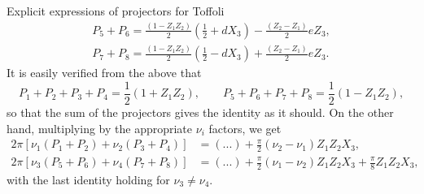 \begin{tbox}[label=tcolorbox:toffoli]{Explicit expressions of projectors for Toffoli \ccheck}
\begin{equation*}
	\end{equation*}
    \begin{align*}
        P_5 + P_6 = 
            \frac{(1 - Z_1 Z_2)}{2} \left(
                \frac12 + d X_3
            \right)
            - \frac{(Z_2 - Z_1)}{2} e Z_3, \\
        P_7 + P_8 = 
            \frac{(1 - Z_1 Z_2)}{2} \left(
                \frac12 - d X_3
            \right)
            + \frac{(Z_2 - Z_1)}{2} e Z_3.
    \end{align*}
	It is easily verified from the above that
	\begin{equation*}
		P_1 + P_2 + P_3 + P_4 = \frac{1}{2} (1 + Z_1 Z_2),
		\qquad
		P_5 + P_6 + P_7 + P_8 = \frac{1}{2} (1 - Z_1 Z_2),
	\end{equation*}
	so that the sum of the projectors gives the identity as it should.
	On the other hand, multiplying by the appropriate $\nu_i$ factors, we get
	\begin{equation*}
	\begin{aligned}
		2\pi\left[\nu_1(P_1 + P_2) + \nu_2(P_3 + P_4)\right]
		&= (...) + \frac{\pi}{2} (\nu_2 - \nu_1) Z_1 Z_2 X_3, \\
		2\pi\left[\nu_3(P_5 + P_6) + \nu_4(P_7 + P_8)\right]
		&= (...) + \frac{\pi}{2} (\nu_1 - \nu_2) Z_1 Z_2 X_3 + \frac{\pi}{8} Z_1 Z_2 X_3,
	\end{aligned}
	\end{equation*}
	with the last identity holding for $\nu_3\neq \nu_4$.
\end{tbox}

